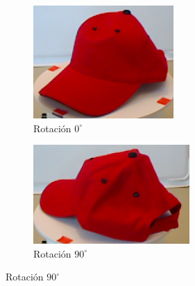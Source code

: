 \begin{figure}
	\centering
	\begin{subfigure}[b]{0.25\textwidth}
		\includegraphics[width=\textwidth]{img/templates/0_crop.png}
		\caption{Rotación $0^{\circ}$}
	\end{subfigure}
	\quad
	\begin{subfigure}[b]{0.25\textwidth}
		\includegraphics[width=\textwidth]{img/templates/90_crop.png}
		\caption{Rotación $90^{\circ}$}
	\end{subfigure}


\end{figure}
